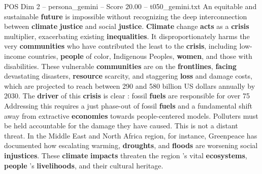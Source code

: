 \begin{textsample}{POS Dim 2 – persona\_gemini – Score 20.00 – t050\_gemini.txt}  \label{ex:f2_pos_044}
An equitable and sustainable \textbf{future} is impossible without recognizing the deep interconnection between \textbf{climate} \textbf{justice} and social \textbf{justice}. \textbf{Climate} change \textbf{acts} as a \textbf{crisis} multiplier, exacerbating existing \textbf{inequalities}.
It disproportionately harms the very \textbf{communities} who have contributed the least to the \textbf{crisis}, including low-income countries, \textbf{people} of color, Indigenous Peoples, \textbf{women}, and those with disabilities.
These vulnerable \textbf{communities} are on the \textbf{frontlines}, \textbf{facing} devastating disasters, \textbf{resource} scarcity, and staggering \textbf{loss} and damage costs, which are projected to reach between 290 and 580 billion US dollars annually by 2030.
The \textbf{driver} of this \textbf{crisis} is clear : fossil \textbf{fuels} are responsible for over 75 %
Addressing this requires a just phase-out of fossil \textbf{fuels} and a fundamental shift away from extractive \textbf{economies} towards people-centered models.
Polluters must be held accountable for the damage they have caused.
This is not a distant threat.
In the Middle East and North Africa region, for instance, Greenpeace has documented how escalating warming, \textbf{droughts}, and \textbf{floods} are worsening social \textbf{injustices}.
These \textbf{climate} \textbf{impacts} threaten the region ’s vital \textbf{ecosystems}, \textbf{people} 's \textbf{livelihoods}, and their cultural heritage.

\end{textsample}
